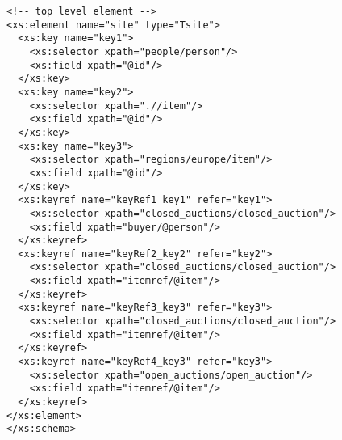 \begin{lstlisting}[caption=Resulting XSD of Test Scenario B, frame=single, label=listing_xsd]
<!-- top level element -->
<xs:element name="site" type="Tsite">
  <xs:key name="key1">
    <xs:selector xpath="people/person"/>
    <xs:field xpath="@id"/>
  </xs:key>
  <xs:key name="key2">
    <xs:selector xpath=".//item"/>
    <xs:field xpath="@id"/>
  </xs:key>
  <xs:key name="key3">
    <xs:selector xpath="regions/europe/item"/>
    <xs:field xpath="@id"/>
  </xs:key>
  <xs:keyref name="keyRef1_key1" refer="key1">
    <xs:selector xpath="closed_auctions/closed_auction"/>
    <xs:field xpath="buyer/@person"/>
  </xs:keyref>
  <xs:keyref name="keyRef2_key2" refer="key2">
    <xs:selector xpath="closed_auctions/closed_auction"/>
    <xs:field xpath="itemref/@item"/>
  </xs:keyref>
  <xs:keyref name="keyRef3_key3" refer="key3">
    <xs:selector xpath="closed_auctions/closed_auction"/>
    <xs:field xpath="itemref/@item"/>
  </xs:keyref>
  <xs:keyref name="keyRef4_key3" refer="key3">
    <xs:selector xpath="open_auctions/open_auction"/>
    <xs:field xpath="itemref/@item"/>
  </xs:keyref>
</xs:element>
</xs:schema>
\end{lstlisting}